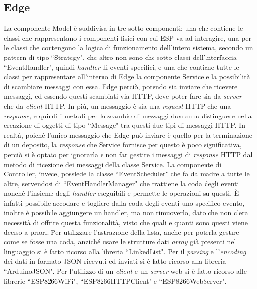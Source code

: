 \documentclass[a4paper, 12pt]{report}
\begin{document}
			\subsection{Edge}
			La componente Model è suddivisa in tre sotto-componenti: una che contiene le classi che
			rappresentano i componenti fisici con cui ESP va ad interagire, una per le classi che
			contengono la logica di funzionamento dell'intero sistema, secondo un pattern di tipo
			``Strategy", che altro non sono che sotto-classi dell'interfaccia ``EventHandler", quindi 
			\textit{handler} di eventi specifici, e una che contiene tutte le classi per rappresentare
			all'interno di Edge la componente Service e la possibilità di scambiare messaggi con essa.
			Edge perciò, potendo sia inviare che ricevere messaggi, ed essendo questi scambiati via
			HTTP, deve poter fare sia da \textit{server} che da \textit{client} HTTP. In più, un
			messaggio è sia una \textit{request} HTTP che una \textit{response}, e quindi i metodi per lo
			scambio di messaggi dovranno distinguere nella creazione di oggetti di tipo ``Message" tra
			questi due tipi di messaggi HTTP. In realtà, poiché l'unico messaggio che Edge può inviare
			è quello per la terminazione di un deposito, la \textit{response} che Service fornisce per
			questo è poco significativa, perciò si è optato per ignorarla e non far gestire i
			messaggi di \textit{response} HTTP dal metodo di ricezione dei messaggi della classe Service.\newline 
			La componente di Controller, invece, possiede la classe ``EventScheduler" che fa da madre a tutte le
			altre, servendosi di ``EventHandlerManager" che trattiene la
			coda degli eventi nonché l'insieme degli \textit{handler} eseguibili e permette le operazioni
			su questi. È infatti possibile accodare e togliere dalla coda degli eventi uno specifico
			evento, inoltre è possibile aggiungere un handler, ma non rimuoverlo, dato che non c'era
			necessità di offrire questa funzionalità, visto che quali e quanti sono questi viene deciso
			a priori.\newline
			Per utilizzare l'astrazione della lista, anche per poterla gestire come se fosse una coda,
			anziché usare le strutture dati \textit{array} già presenti nel linguaggio si è fatto
			ricorso alla libreria ``LinkedList". Per il \textit{parsing} e l'\textit{encoding} dei dati in formato
			JSON ricevuti ed inviati si è fatto ricorso alla libreria ``ArduinoJSON". Per l'utilizzo di
			un \textit{client} e un \textit{server} web si è fatto ricorso alle
			librerie ``ESP8266WiFi", ``ESP8266HTTPClient" e ``ESP8266WebServer".
\end{document}
